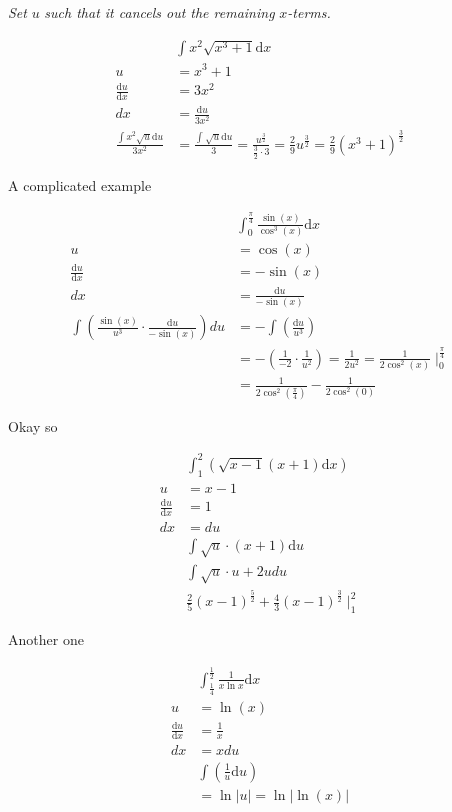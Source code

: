 \documentclass[12pt]{article}
\theoremstyle{plain}
\theoremstyle{remark}
\theoremstyle{definition}
\begin{document}
\emph{Set} \(u\) \emph{such that it cancels out the remaining}
\(x\)\emph{-terms.}

\begin{align*}
&\int x^{2}\sqrt{x^{3} + 1}\text{d}x \\
u &= x^{3} + 1 \\
\frac{\text{d}u}{\text{d}x} &= 3x^{2} \\
dx &= \frac{\text{d}u}{3x^{2}} \\
\frac{\int x^{2}\sqrt{u}\text{d}u}{3x^{2}} &= \frac{\int_{}^{}\sqrt{u}\text{d}u}{3} = \frac{u^{\frac{3}{2}}}{\frac{3}{2} \cdot 3} = \frac{2}{9}u^{\frac{3}{2}} = \frac{2}{9}\left( x^{3} + 1 \right)^{\frac{3}{2}}
\end{align*}


A complicated example

\begin{align*}
&\int_{0}^{\frac{\pi}{4}}{\frac{\sin(x)}{\cos^{3}(x)}\text{d}x} \\
u &= \cos(x) \\
\frac{\text{d}u}{\text{d}x} &= - \sin(x) \\
dx &= \frac{\text{d}u}{- \sin(x)} \\
\int\left( \frac{\sin(x)}{u^{3}} \cdot \frac{\text{d}u}{- \sin(x)} \right)du &= - \int\left( \frac{\text{d}u}{u^{3}} \right) \\
&= - \left( \frac{1}{- 2} \cdot \frac{1}{u^{2}} \right) = \frac{1}{2u^{2}} = \frac{1}{2\cos^{2}(x)} \mid_{0}^{\frac{\pi}{4}} \\
&= \frac{1}{2\cos^{2}\left( \frac{\pi}{4} \right)} - \frac{1}{2\cos^{2}(0)}
\end{align*}


Okay so

\begin{align*}
&\int_{1}^{2}\left( \sqrt{x - 1}(x + 1)\text{d}x \right) \\
u &= x - 1 \\
\frac{\text{d}u}{\text{d}x} &= 1 \\
dx &= du \\
&\int\sqrt{u} \cdot (x + 1)\text{d}u \\
&\int\sqrt{u} \cdot u + 2udu \\
&\frac{2}{5}(x - 1)^{\frac{5}{2}} + \frac{4}{3}(x - 1)^{\frac{3}{2}} \mid_{1}^{2}
\end{align*}


Another one

\begin{align*}
&\int_{\frac{1}{4}}^{\frac{1}{2}}{\frac{1}{x\ln x}\text{d}x} \\
u &= \ln(x) \\
\frac{\text{d}u}{\text{d}x} &= \frac{1}{x} \\
dx &= xdu \\
&\int\left( \frac{1}{u}\text{d}u \right) \\
&= \ln|u| = \ln\left| \ln(x) \right|
\end{align*}
\end{document}
